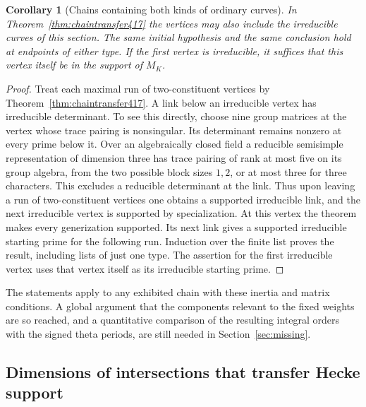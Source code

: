 \documentclass[a4paper,11pt]{article}
\newtheorem{corollary}[proposition]{Corollary}
\theoremstyle{definition}
\theoremstyle{remark}
\numberwithin{equation}{section}
\begin{document}
\begin{corollary}[Chains containing both kinds of ordinary curves]\leavevmode
\label{cor:mixedchain418}
In Theorem~\ref{thm:chaintransfer417} the vertices may also
include the irreducible curves of this section. The same
initial hypothesis and the same conclusion hold at endpoints
of either type. If the first vertex is irreducible, it
suffices that this vertex itself be in the support of \(M_K\).
\end{corollary}
\begin{proof}
Treat each maximal run of two-constituent vertices by
Theorem~\ref{thm:chaintransfer417}. A link below an
irreducible vertex has irreducible determinant. To see this
directly, choose nine group matrices at the vertex whose
trace pairing is nonsingular. Its determinant remains
nonzero at every prime below it. Over an algebraically
closed field a reducible semisimple representation of
dimension three has trace pairing of rank at most five on
its group algebra, from the two possible block sizes \(1,2\),
or at most three for three characters. This excludes a
reducible determinant at the link. Thus upon leaving a
run of two-constituent vertices one obtains a supported
irreducible link, and the next irreducible vertex is
supported by specialization. At this vertex the theorem
makes every generization supported. Its next link gives
a supported irreducible starting prime for the following
run. Induction over the finite list proves the result,
including lists of just one type. The assertion for the
first irreducible vertex uses that vertex itself as its
irreducible starting prime.
\end{proof}

The statements apply to any exhibited chain with these
inertia and matrix conditions. A global argument that the
components relevant to the fixed weights are so reached,
and a quantitative comparison of the resulting integral
orders with the signed theta periods, are still needed in
Section~\ref{sec:missing}.


\subsection{Dimensions of intersections that transfer Hecke support}
\label{sec:weightintersections419}
\end{document}
